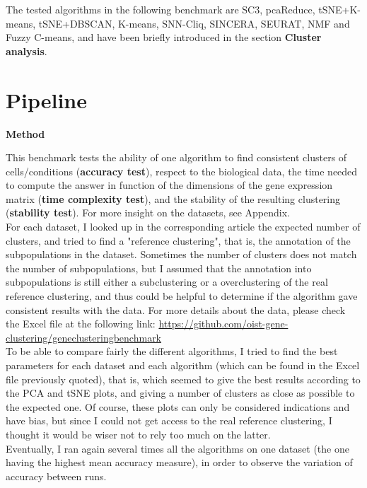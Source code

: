 \documentclass{report}
\begin{document}
{The tested algorithms in the following benchmark are SC3, pcaReduce, tSNE+K-means, tSNE+DBSCAN, K-means, SNN-Cliq, SINCERA, SEURAT, NMF and Fuzzy C-means, and have been briefly introduced in the section \textbf{Cluster analysis}.\\

\section{Pipeline}

\bigskip
\noindent \textbf{Method}
\bigskip

This benchmark tests the ability of one algorithm to find consistent clusters of cells/conditions (\textbf{accuracy test}), respect to the biological data, the time needed to compute the answer in function of the dimensions of the gene expression matrix (\textbf{time complexity test}), and the stability of the resulting clustering (\textbf{stability test}). For more insight on the datasets, see Appendix.\\

For each dataset, I looked up in the corresponding article the expected number of clusters, and tried to find a "reference clustering", that is, the annotation of the subpopulations in the dataset. Sometimes the number of clusters does not match the number of subpopulations, but I assumed that the annotation into subpopulations is still either a subclustering or a overclustering of the real reference clustering, and thus could be helpful to determine if the algorithm gave consistent results with the data. For more details about the data, please check the Excel file at the following link: {\url{https://github.com/oist-gene-clustering/geneclusteringbenchmark}}\\ 

To be able to compare fairly the different algorithms, I tried to find the best parameters for each dataset and each algorithm (which can be found in the Excel file previously quoted), that is, which seemed to give the best results according to the PCA and tSNE plots, and giving a number of clusters as close as possible to the expected one. Of course, these plots can only be considered indications and have bias, but since I could not get access to the real reference clustering, I thought it would be wiser not to rely too much on the latter.\\

Eventually, I ran again several times all the algorithms on one dataset (the one having the highest mean accuracy measure), in order to observe the variation of accuracy between runs.

}
\end{document}
